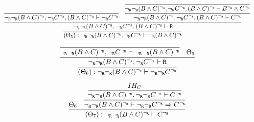 \begin{enumerate}[(i)]
\begin{itemize}
            $$
            \infer{
                            (\Theta_5) : \neg_\R\neg_\R(B \wedge C)^{\neg_\R}, \neg_\R C^{\neg_\R} \vdash \neg_\R(B \wedge C)^{\neg_\R}
                        }{
                            \infer{
                                \neg_\R\neg_\R(B \wedge C)^{\neg_\R}, \neg_\R C^{\neg_\R}, (B \wedge C)^{\neg_\R} \vdash \R
                            }{
                                \infer{
                                    \neg_\R\neg_\R(B \wedge C)^{\neg_\R}, \neg_\R C^{\neg_\R}, (B \wedge C)^{\neg_\R} \vdash \neg_\R C^{\neg_\R}
                                }{
                                }&
                                \infer{
                                    \neg_\R\neg_\R(B \wedge C)^{\neg_\R}, \neg_\R C^{\neg_\R}, (B \wedge C)^{\neg_\R} \vdash C^{\neg_\R}
                                }{
                                    \infer{
                                        \neg_\R\neg_\R(B \wedge C)^{\neg_\R}, \neg_\R C^{\neg_\R}, (B \wedge C)^{\neg_\R} \vdash B^{\neg_\R} \wedge C^{\neg_\R}
                                    }{
                                    }
                                }
                            }
                        }
            $$        
        
            $$
            \infer{
                    (\Theta_6) : \neg_\R\neg_\R(B \wedge C)^{\neg_\R} \vdash \neg_\R\neg_\R C^{\neg_\R}
                }{
                    \infer{
                        \neg_\R\neg_\R(B \wedge C)^{\neg_\R}, \neg_\R C^{\neg_\R} \vdash \R
                    }{
                        \infer{
                            \neg_\R\neg_\R(B \wedge C)^{\neg_\R}, \neg_\R C^{\neg_\R} \vdash \neg_\R\neg_\R(B \wedge C)^{\neg_\R}
                        }{
                        }&
                        \Theta_5
                    }
                }
            $$        
        
            $$
            \infer{
                (\Theta_7) : \neg_\R\neg_\R(B \wedge C)^{\neg_\R} \vdash C^{\neg_\R}
            }{
                \Theta_6
                &
                \infer{
                    \neg_\R\neg_\R(B \wedge C)^{\neg_\R} \vdash \neg_\R\neg_\R C^{\neg_\R} \Rightarrow  C^{\neg_\R}
                }{
                    \infer{
                        \neg_\R\neg_\R(B \wedge C)^{\neg_\R}, \neg_\R\neg_\R C^{\neg_\R} \vdash  C^{\neg_\R}
                    }{
                        IH_C
                    }
                }
            }
            $$
            

\end{itemize}
\end{enumerate}
